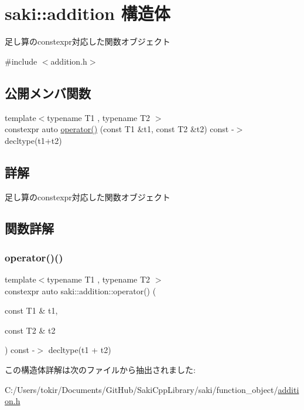 \hypertarget{structsaki_1_1addition}{}\section{saki\+:\+:addition 構造体}
\label{structsaki_1_1addition}


足し算のconstexpr対応した関数オブジェクト  




{\ttfamily \#include $<$addition.\+h$>$}

\subsection*{公開メンバ関数}
\begin{DoxyCompactItemize}
\item 
{\footnotesize template$<$typename T1 , typename T2 $>$ }\\constexpr auto \mbox{\hyperlink{structsaki_1_1addition_a9ff50aceb91ac6f0e821ee8d408a1e58}{operator()}} (const T1 \&t1, const T2 \&t2) const -\/$>$ decltype(t1+t2)
\end{DoxyCompactItemize}


\subsection{詳解}
足し算のconstexpr対応した関数オブジェクト 

\subsection{関数詳解}
\mbox{\label{structsaki_1_1addition_a9ff50aceb91ac6f0e821ee8d408a1e58}} 
\subsubsection{\texorpdfstring{operator()()}{operator()()}}
{\footnotesize\ttfamily template$<$typename T1 , typename T2 $>$ \\
constexpr auto saki\+::addition\+::operator() (\begin{DoxyParamCaption}\item[{const T1 \&}]{t1,  }\item[{const T2 \&}]{t2 }\end{DoxyParamCaption}) const -\/$>$ decltype(t1 + t2)
		\hspace{0.3cm}{\ttfamily [inline]}}



この構造体詳解は次のファイルから抽出されました\+:\begin{DoxyCompactItemize}
\item 
C\+:/\+Users/tokir/\+Documents/\+Git\+Hub/\+Saki\+Cpp\+Library/saki/function\+\_\+object/\mbox{\hyperlink{addition_8h}{addition.\+h}}\end{DoxyCompactItemize}

